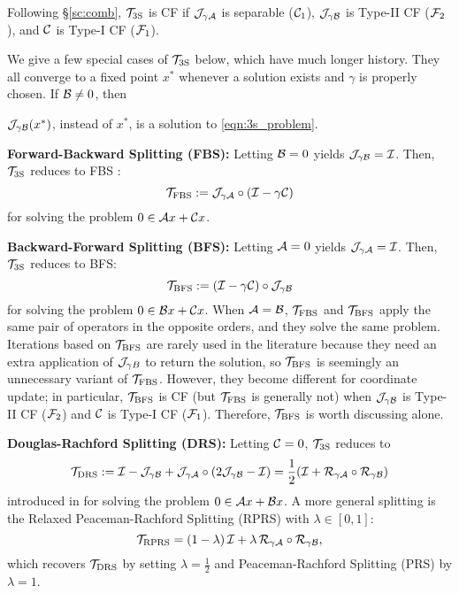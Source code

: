 Following \S\ref{sc:comb},  ${{\mathcal{T}}_{\mathrm{3S}}}$ {is CF if } ${\mathcal{J}}_{\gamma {\mathcal{A}}}$ is separable (${\mathcal{C}}_1$), ${\mathcal{J}}_{\gamma {\mathcal{B}}}$ is Type-II CF (${\mathcal{F}}_2$), and ${\mathcal{C}}$ is Type-I CF (${\mathcal{F}}_1$). %

We give a few special cases of ${{\mathcal{T}}_{\mathrm{3S}}}$ below, which have much longer history. They all converge to a fixed point $x^*$ whenever a solution exists and $\gamma$ is properly chosen. If ${\mathcal{B}}\neq 0$, then {${\mathcal{J}}_{\gamma {\mathcal{B}}}(x^*)$, instead of $x^*$, is a solution to \eqref{eqn:3s_problem}.

 \textbf{Forward-Backward Splitting (FBS):} Letting ${\mathcal{B}}=0$ yields ${\mathcal{J}}_{\gamma{\mathcal{B}}}={\mathcal{I}}$. Then, ${{\mathcal{T}}_{\mathrm{3S}}}$ reduces to FBS \cite{passty1979FBS}:
 \begin{equation}\label{eq:FBS}
 \TFBS:=\cJ_{\gamma \cA}\circ(\cI-\gamma \cC)
 \end{equation}
 for solving the problem $0\in{\mathcal{A}} x+{\mathcal{C}} x$.

\textbf{Backward-Forward Splitting (BFS):} Letting ${\mathcal{A}}=0$ yields ${\mathcal{J}}_{\gamma{\mathcal{A}}}={\mathcal{I}}$. Then, ${{\mathcal{T}}_{\mathrm{3S}}}$ reduces to BFS:
  \begin{equation}\label{eq:BFS}\TBFS:=(\cI-\gamma \cC)\circ \cJ_{\gamma \cB}
  \end{equation}
for solving the problem $0\in{\mathcal{B}} x+{\mathcal{C}} x$. When ${\mathcal{A}}={\mathcal{B}}$, ${{\mathcal{T}}_{\mathrm{FBS}}}$ and ${{\mathcal{T}}_{\mathrm{BFS}}}$ apply the same pair of operators in the opposite orders, and they solve the same problem. Iterations based on ${{\mathcal{T}}_{\mathrm{BFS}}}$ are rarely used in the literature because they  need an extra application of ${\mathcal{J}}_{\gamma B}$ to return the solution, so ${{\mathcal{T}}_{\mathrm{BFS}}}$ is seemingly an unnecessary variant of ${{\mathcal{T}}_{\mathrm{FBS}}}$. However, they become  different for coordinate update; in particular, ${{\mathcal{T}}_{\mathrm{BFS}}}$ is CF (but ${{\mathcal{T}}_{\mathrm{FBS}}}$ is generally not) when ${\mathcal{J}}_{\gamma {\mathcal{B}}}$ is Type-II CF (${\mathcal{F}}_2$) and ${\mathcal{C}}$ is Type-I CF (${\mathcal{F}}_1$). Therefore, ${{\mathcal{T}}_{\mathrm{BFS}}}$ is worth discussing alone.

\textbf{Douglas-Rachford Splitting (DRS):} Letting ${\mathcal{C}}=0$, ${{\mathcal{T}}_{\mathrm{3S}}}$ reduces to
  \begin{equation}\label{eq:DRS}\TDRS:=\cI-\cJ_{\gamma \cB}+\cJ_{\gamma\cA}\circ(2\cJ_{\gamma \cB}-\cI)=\frac{1}{2}(\cI+\cR_{\gamma\cA}\circ \cR_{\gamma\cB})
  \end{equation}
introduced in \cite{douglas1956DRS} for solving the problem $0\in{\mathcal{A}} x+{\mathcal{B}} x$. A more general splitting is the  Relaxed Peaceman-Rachford Splitting (RPRS) with $\lambda\in[0,1]$:
 \begin{equation}
\cT_{\text{RPRS}} = (1 - \lambda)\, \cI + \lambda \, \cR_{\gamma \cA} \circ \cR_{\gamma \cB},
\end{equation}
which recovers ${{\mathcal{T}}_{\mathrm{DRS}}}$ by setting $\lambda=\frac{1}{2}$ and Peaceman-Rachford Splitting (PRS) \cite{peaceman1955PRS} by $\lambda=1$.

}
